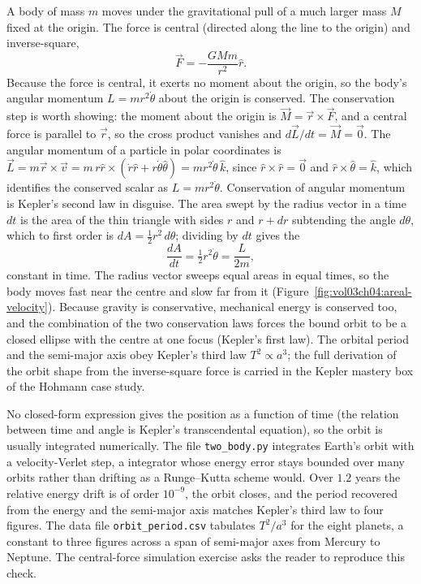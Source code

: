 A body of mass $m$ moves under the gravitational pull of a much larger
mass $M$ fixed at the origin. The force is central (directed along the
line to the origin) and inverse-square,
\[
\vec{F}=-\frac{GMm}{r^{2}}\hat{r}.
\]
Because the force is central, it exerts no moment about the origin, so
the body's angular momentum $L=mr^{2}\dot{\theta}$ about the origin is
conserved. The conservation step is worth showing: the moment about the
origin is $\vec{M}=\vec{r}\times\vec{F}$, and a central force is parallel
to $\vec{r}$, so the cross product vanishes and $d\vec{L}/dt=\vec{M}=
\vec{0}$. The angular momentum of a particle in polar coordinates is
$\vec{L}=m\vec{r}\times\vec{v}=m\,r\hat{r}\times(\dot{r}\hat{r}+r
\dot{\theta}\hat{\theta})=mr^{2}\dot{\theta}\,\hat{k}$, since
$\hat{r}\times\hat{r}=\vec{0}$ and $\hat{r}\times\hat{\theta}=\hat{k}$,
which identifies the conserved scalar as $L=mr^{2}\dot{\theta}$.
Conservation of angular momentum is Kepler's second law in disguise. The
area swept by the radius vector in a time $dt$ is the area of the thin
triangle with sides $r$ and $r+dr$ subtending the angle $d\theta$, which
to first order is $dA=\tfrac{1}{2}r^{2}\,d\theta$; dividing by $dt$ gives
the 
\[
\frac{dA}{dt}=\tfrac{1}{2}r^{2}\dot{\theta}=\frac{L}{2m},
\]
constant in time. The radius vector sweeps equal areas in equal times,
so the body moves fast near the centre and slow far from it
(Figure~\ref{fig:vol03ch04:areal-velocity}). Because gravity is
conservative, mechanical energy is conserved too, and the combination of
the two conservation laws forces the bound orbit to be a closed ellipse
with the centre at one focus (Kepler's first law). The orbital period
and the semi-major axis obey Kepler's third law $T^{2}\propto a^{3}$;
the full derivation of the orbit shape from the inverse-square force is
carried in the Kepler mastery box of the Hohmann case study.





No closed-form expression gives the position as a function of time
(the relation between time and angle is Kepler's transcendental
equation), so the orbit is usually integrated numerically. The file
\texttt{two\_body.py} integrates Earth's orbit with a velocity-Verlet
step, a  integrator whose energy error stays
bounded over many orbits rather than drifting as a Runge--Kutta scheme
would. Over $1.2$ years the relative energy drift is of order
$10^{-9}$, the orbit closes, and the period recovered from the energy
and the semi-major axis matches Kepler's third law to four figures.
The data file \texttt{orbit\_period.csv} tabulates $T^{2}/a^{3}$ for
the eight planets, a constant to three figures across a span of
semi-major axes from Mercury to Neptune. The central-force simulation
exercise asks the reader to reproduce this check.

